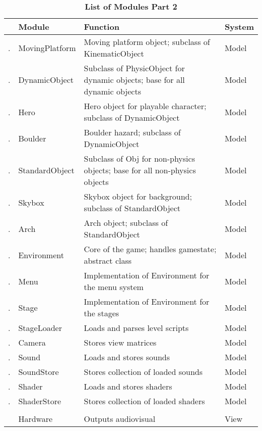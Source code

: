 \documentclass[12pt, titlepage]{article}
\newcounter{ModList}
\newcommand{\printMod}{
    \stepcounter{ModList}
    \arabic{ModList}.
}
\begin{document}
\begin{table}[h]
\caption{\bf List of Modules Part 2} \label{tab:modules2}
\begin{tabularx}{\textwidth}{p{0.4cm}p{3.5cm}p{6cm}X}
\toprule & {\bf Module} & {\bf Function} & {\bf System}\\
\midrule
\printMod & MovingPlatform & Moving platform object; subclass of KinematicObject & Model\\
\printMod & DynamicObject & Subclass of PhysicObject for dynamic objects; base for all dynamic objects & Model\\
\printMod & Hero & Hero object for playable character; subclass of DynamicObject & Model\\
\printMod & Boulder & Boulder hazard; subclass of DynamicObject & Model\\
\printMod & StandardObject & Subclass of Obj for non-physics objects; base for all non-physics objects & Model\\
\printMod & Skybox & Skybox object for background; subclass of StandardObject & Model\\
\printMod & Arch & Arch object; subclass of StandardObject & Model\\
\printMod & Environment & Core of the game; handles gamestate; abstract class & Model\\
\printMod & Menu & Implementation of Environment for the menu system & Model\\
\printMod & Stage & Implementation of Environment for the stages & Model\\
\printMod & StageLoader & Loads and parses level scripts & Model\\
\printMod & Camera & Stores view matrices & Model\\
\printMod & Sound & Loads and stores sounds & Model\\
\printMod & SoundStore & Stores collection of loaded sounds & Model\\
\printMod & Shader & Loads and stores shaders & Model\\
\printMod & ShaderStore & Stores collection of loaded shaders & Model\\
\\
 & Hardware & Outputs audiovisual & View\\
\bottomrule
\end{tabularx}
\end{table}

\FloatBarrier
\end{document}
